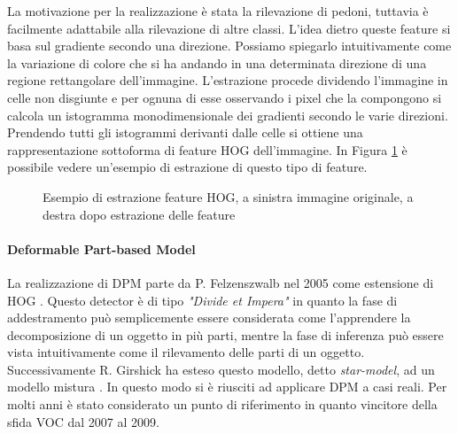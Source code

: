 La motivazione per la realizzazione è stata la rilevazione di pedoni, tuttavia è facilmente adattabile alla rilevazione di altre classi. 
L'idea dietro queste feature si basa sul gradiente secondo una direzione. Possiamo spiegarlo intuitivamente come la variazione di colore che si ha andando in una determinata direzione di una regione rettangolare dell'immagine. 
L'estrazione procede dividendo l'immagine in celle non disgiunte e per ognuna di esse osservando i pixel che la compongono si calcola un istogramma monodimensionale dei gradienti secondo le varie direzioni. Prendendo tutti gli istogrammi derivanti dalle celle si ottiene una rappresentazione sottoforma di feature \ac{HOG} dell'immagine. In Figura \ref{fig:hog} è possibile vedere un'esempio di estrazione di questo tipo di feature.
\begin{figure}[]
    \centering
    \caption{Esempio di estrazione feature HOG, a sinistra immagine originale, a destra dopo estrazione delle feature} 
    \label{fig:hog} 
\end{figure}

\paragraph{Deformable Part-based Model} 
La realizzazione di \ac{DPM} parte da P. Felzenszwalb nel 2005 come estensione di \ac{HOG} \cite{felzenszwalb2008discriminatively}. Questo detector è di tipo \textit{"Divide et Impera"} in quanto la fase di addestramento può semplicemente essere considerata come l'apprendere la decomposizione di un oggetto in più parti, mentre la fase di inferenza può essere vista intuitivamente come il rilevamento delle parti di un oggetto. 
Successivamente R. Girshick ha esteso questo modello, detto \textit{star-model}, ad un modello mistura \cite{felzenszwalb2010cascade, felzenszwalb2009object, girshick2011object, girshick2012rigid}. In questo modo si è riusciti ad applicare \ac{DPM} a casi reali. Per molti anni è stato considerato un punto di riferimento in quanto vincitore della sfida \ac{VOC} dal 2007 al 2009.

